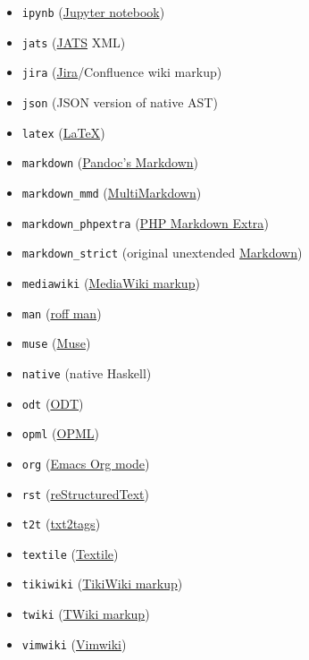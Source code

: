 \documentclass[]{article}
\begin{document}
\begin{description}
\begin{itemize}
\item
  \texttt{ipynb}
  (\href{https://nbformat.readthedocs.io/en/latest/}{Jupyter notebook})
\item
  \texttt{jats} (\href{https://jats.nlm.nih.gov}{JATS} XML)
\item
  \texttt{jira}
  (\href{https://jira.atlassian.com/secure/WikiRendererHelpAction.jspa?section=all}{Jira}/Confluence
  wiki markup)
\item
  \texttt{json} (JSON version of native AST)
\item
  \texttt{latex} (\href{https://www.latex-project.org/}{LaTeX})
\item
  \texttt{markdown} (\protect\hyperlink{pandocs-markdown}{Pandoc's
  Markdown})
\item
  \texttt{markdown\_mmd}
  (\href{https://fletcherpenney.net/multimarkdown/}{MultiMarkdown})
\item
  \texttt{markdown\_phpextra}
  (\href{https://michelf.ca/projects/php-markdown/extra/}{PHP Markdown
  Extra})
\item
  \texttt{markdown\_strict} (original unextended
  \href{https://daringfireball.net/projects/markdown/}{Markdown})
\item
  \texttt{mediawiki}
  (\href{https://www.mediawiki.org/wiki/Help:Formatting}{MediaWiki
  markup})
\item
  \texttt{man} (\href{https://man.cx/groff_man(7)}{roff man})
\item
  \texttt{muse} (\href{https://amusewiki.org/library/manual}{Muse})
\item
  \texttt{native} (native Haskell)
\item
  \texttt{odt} (\href{https://en.wikipedia.org/wiki/OpenDocument}{ODT})
\item
  \texttt{opml} (\href{http://dev.opml.org/spec2.html}{OPML})
\item
  \texttt{org} (\href{https://orgmode.org}{Emacs Org mode})
\item
  \texttt{rst}
  (\href{https://docutils.sourceforge.io/docs/ref/rst/introduction.html}{reStructuredText})
\item
  \texttt{t2t} (\href{https://txt2tags.org}{txt2tags})
\item
  \texttt{textile} (\href{https://www.promptworks.com/textile}{Textile})
\item
  \texttt{tikiwiki}
  (\href{https://doc.tiki.org/Wiki-Syntax-Text\#The_Markup_Language_Wiki-Syntax}{TikiWiki
  markup})
\item
  \texttt{twiki}
  (\href{https://twiki.org/cgi-bin/view/TWiki/TextFormattingRules}{TWiki
  markup})
\item
  \texttt{vimwiki} (\href{https://vimwiki.github.io}{Vimwiki})
\end{itemize}


\end{description}
\end{document}
